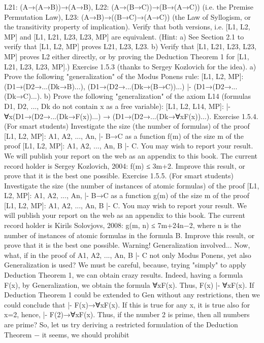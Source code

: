 L21: (A→(A→B))→(A→B),
L22: (A→(B→C))→(B→(A→C)) (i.e. the Premise Permutation Law),
L23: (A→B)→((B→C)→(A→C)) (the Law of Syllogism, or the transitivity property of implication).
Verify that both versions, i.e. [L1, L2, MP] and [L1, L21, L23, L23, MP] are equivalent. (Hint: a) See
Section 2.1 to verify that [L1, L2, MP] proves L21, L23, L23. b) Verify that [L1, L21, L23, L23, MP] proves
L2 either directly, or by proving the Deduction Theorem 1 for [L1, L21, L23, L23, MP].)
Exercise 1.5.3 (thanks to Sergey Kozlovich for the idea).
a) Prove the following "generalization" of the Modus Ponens rule:
[L1, L2, MP]: (D1→(D2→...(Dk→B)...), (D1→(D2→...(Dk→(B→C))...) |- (D1→(D2→...(Dk→C)...).
b) Prove the following "generalization" of the axiom L14 (formulas D1, D2, ..., Dk do not contain x as a
free variable):
[L1, L2, L14, MP]: |- ∀x(D1→(D2→...(Dk→F(x))...) → (D1→(D2→...(Dk→∀xF(x))...).
Exercise 1.5.4. (For smart students) Investigate the size (the number of formulas) of the proof [L1, L2,
MP]: A1, A2, ..., An, |- B→C as a function f(m) of the size m of the proof [L1, L2, MP]: A1, A2, ..., An, B |-
C. You may wish to report your result. We will publish your report on the web as an appendix to this
book. The current record holder is Sergey Kozlovich, 2004: f(m) ≤ 3m+2. Improve this result, or prove
that it is the best one possible.
Exercise 1.5.5. (For smart students) Investigate the size (the number of instances of atomic formulas) of
the proof [L1, L2, MP]: A1, A2, ..., An, |- B→C as a function g(m) of the size m of the proof [L1, L2, MP]:
A1, A2, ..., An, B |- C. You may wish to report your result. We will publish your report on the web as an
appendix to this book. The current record holder is Kirils Solovjovs, 2008: g(m, n) ≤ 7m+24n−2, where n
is the number of instances of atomic formulas in the formula B. Improve this result, or prove that it is the
best one possible.
Warning! Generalization involved...
Now, what, if in the proof of A1, A2, ..., An, B |- C not only Modus Ponens, yet also Generalization is
used?
We must be careful, because, trying "simply" to apply Deduction Theorem 1, we can obtain crazy results.
Indeed, having a formula F(x), by Generalization, we obtain the formula ∀xF(x). Thus, F(x) |- ∀xF(x). If
Deduction Theorem 1 could be extended to Gen without any restrictions, then we could conclude that |-
F(x)→∀xF(x). If this is true for any x, it is true also for x=2, hence, |- F(2)→∀xF(x). Thus, if the number
2 is prime, then all numbers are prime?
So, let us try deriving a restricted formulation of the Deduction Theorem − it seems, we should prohibit
